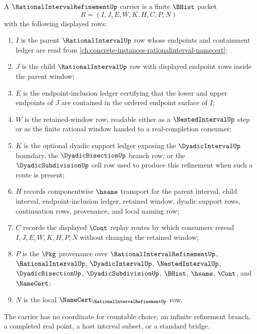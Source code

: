 \begin{definition}
\label{def:rational-interval-refinement-carrier}
A $\RationalIntervalRefinementUp$ carrier is a finite $\BHist$ packet
$$
R=(I,J,E,W,K,H,C,P,N)
$$
with the following displayed rows:
\begin{enumerate}
\item $I$ is the parent $\RationalIntervalUp$ row whose endpoints and containment ledger are read from \autoref{ch:concrete-instances-rationalinterval-namecert};
\item $J$ is the child $\RationalIntervalUp$ row with displayed endpoint rows inside the parent window;
\item $E$ is the endpoint-inclusion ledger certifying that the lower and upper endpoints of $J$ are contained in the ordered endpoint surface of $I$;
\item $W$ is the retained-window row, readable either as a $\NestedIntervalUp$ step or as the finite rational window handed to a real-completion consumer;
\item $K$ is the optional dyadic support ledger exposing the $\DyadicIntervalUp$ boundary, the $\DyadicBisectionUp$ branch row, or the $\DyadicSubdivisionUp$ cell row used to produce this refinement when such a route is present;
\item $H$ records componentwise $\hsame$ transport for the parent interval, child interval, endpoint-inclusion ledger, retained window, dyadic support rows, continuation rows, provenance, and local naming row;
\item $C$ records the displayed $\Cont$ replay routes by which consumers reread $I,J,E,W,K,H,P,N$ without changing the retained window;
\item $P$ is the $\Pkg$ provenance over $\RationalIntervalRefinementUp$, $\RationalIntervalUp$, $\DyadicIntervalUp$, $\NestedIntervalUp$, $\DyadicBisectionUp$, $\DyadicSubdivisionUp$, $\BHist$, $\hsame$, $\Cont$, and $\NameCert$;
\item $N$ is the local $\NameCert_{\RationalIntervalRefinementUp}$ row.
\end{enumerate}
The carrier has no coordinate for countable choice, an infinite refinement branch, a completed real point, a host interval subset, or a standard bridge.
\end{definition}


